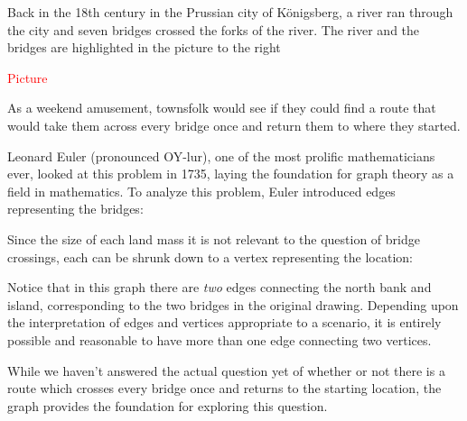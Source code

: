 \begin{example}{}{}

Back in the 18th century in the Prussian city of K\"onigsberg, a river ran through the city and seven bridges crossed the forks of the river.  The river and the bridges are highlighted in the picture to the right%

\textcolor{red}{Picture}

As a weekend amusement, townsfolk would see if they could find a route that would take them across every bridge once and return them to where they started.

Leonard Euler (pronounced OY-lur), one of the most prolific mathematicians ever, looked at this problem in 1735, laying the foundation for graph theory as a field in mathematics.  To analyze this problem, Euler introduced edges representing the bridges:
\begin{center}
\end{center}
Since the size of each land mass it is not relevant to the question of bridge crossings, each can be shrunk down to a vertex representing the location:
\begin{center}
\end{center}

Notice that in this graph there are \textit{two} edges connecting the north bank and island, corresponding to the two bridges in the original drawing.  Depending upon the interpretation of edges and vertices appropriate to a scenario, it is entirely possible and reasonable to have more than one edge connecting two vertices.

While we haven't answered the actual question yet of whether or not there is a route which crosses every bridge once and returns to the starting location, the graph provides the foundation for exploring this question.
 \end{example}


